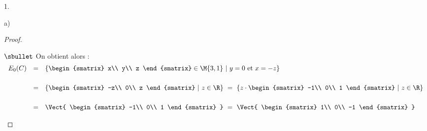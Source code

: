 \documentclass[11pt]{article}%
\begin{document}
\begin{noliste}{1.}
\begin{noliste}{a)}
\begin{proof}
\begin{noliste}{$\sbullet$}
	\noindent
	On obtient alors :
	\[
	\begin{array}{rcl}
          E_0(C) & = & \{
          \begin{smatrix}
            x\\
            y\\
            z
          \end{smatrix}
          \in \M{3,1} \ 
          \vert \
          y=0 \mbox{ et } x=-z \}
          \\[.6cm]
          & = & \{
          \begin{smatrix}
            -z\\
            0\\
            z
          \end{smatrix}
          \ | \ z\in\R
          \}
          \ = \ \{z \cdot
          \begin{smatrix}
            -1\\
            0\\
            1
          \end{smatrix}
          \ | \ z\in\R
          \}
          \\[.6cm]
          & = & \Vect{
            \begin{smatrix}
              -1\\
              0\\
              1
            \end{smatrix}
          }
          \ = \ \Vect{
            \begin{smatrix}
              1\\
              0\\
              -1
            \end{smatrix}
          }
	\end{array}
	\]
	

\end{noliste}
\end{proof}
\end{noliste}
\end{noliste}
\end{document}
